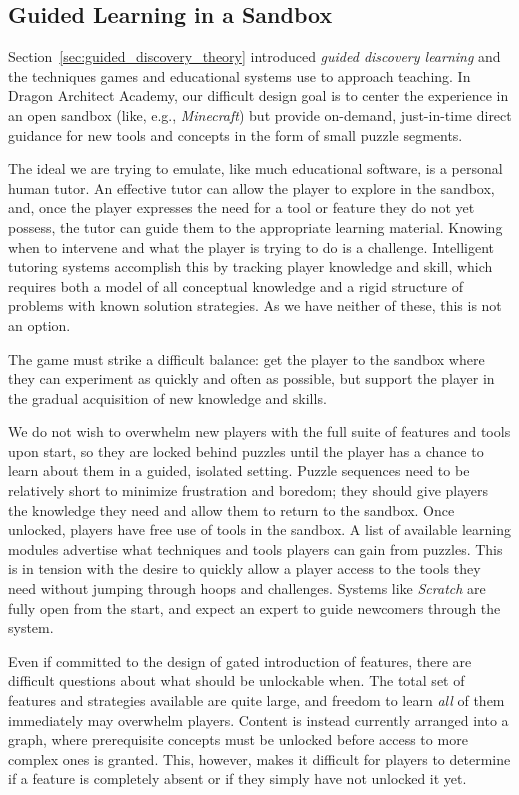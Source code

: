 \documentclass{sig-alternate}
\newcommand{\gametitle}{{\color{RoyalPurple} Dragon Architect Academy}}
\begin{document}
\subsection{Guided Learning in a Sandbox}
\label{sec:direct_guidance}

Section~\ref{sec:guided_discovery_theory} introduced \emph{guided discovery learning} and the techniques games and educational systems use to approach teaching.
In \gametitle{}, our difficult design goal is to center the experience in an open sandbox (like, e.g., \emph{Minecraft}) but provide on-demand, just-in-time direct guidance for new tools and concepts in the form of small puzzle segments.

The ideal we are trying to emulate, like much educational software, is a personal human tutor.
An effective tutor can allow the player to explore in the sandbox, and, once the player expresses the need for a tool or feature they do not yet possess, the tutor can guide them to the appropriate learning material.
Knowing when to intervene and what the player is trying to do is a challenge.
Intelligent tutoring systems accomplish this by tracking player knowledge and skill, which requires both a model of all conceptual knowledge and a rigid structure of problems with known solution strategies.
As we have neither of these, this is not an option.

The game must strike a difficult balance: get the player to the sandbox where they can experiment as quickly and often as possible, but support the player in the gradual acquisition of new knowledge and skills. 

We do not wish to overwhelm new players with the full suite of features and tools upon start, so they are locked behind puzzles until the player has a chance to learn about them in a guided, isolated setting.
Puzzle sequences need to be relatively short to minimize frustration and boredom; they should give players the knowledge they need and allow them to return to the sandbox.
Once unlocked, players have free use of tools in the sandbox.
A list of available learning modules advertise what techniques and tools players can gain from puzzles.
This is in tension with the desire to quickly allow a player access to the tools they need without jumping through hoops and challenges. 
Systems like \emph{Scratch} are fully open from the start, and expect an expert to guide newcomers through the system.

Even if committed to the design of gated introduction of features, there are difficult questions about what should be unlockable when.
The total set of features and strategies available are quite large, and freedom to learn \emph{all} of them immediately may overwhelm players.
Content is instead currently arranged into a graph, where prerequisite concepts must be unlocked before access to more complex ones is granted.
This, however, makes it difficult for players to determine if a feature is completely absent or if they simply have not unlocked it yet.
\end{document}
